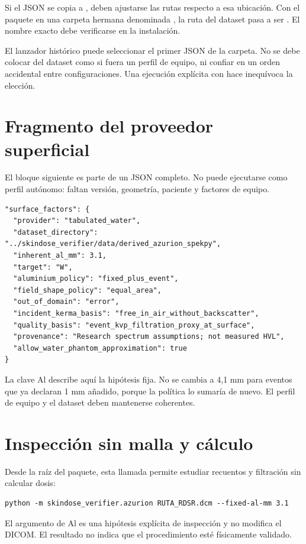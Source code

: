 Si el JSON se copia a , deben ajustarse las rutas respecto a esa ubicación. Con el paquete en una carpeta hermana denominada , la ruta del dataset pasa a ser . El nombre exacto debe verificarse en la instalación.

El lanzador histórico puede seleccionar el primer JSON de la carpeta. No se debe colocar  del dataset como si fuera un perfil de equipo, ni confiar en un orden accidental entre configuraciones. Una ejecución explícita con  hace inequívoca la elección.

\section{Fragmento del proveedor superficial}
El bloque siguiente es parte de un JSON completo. No puede ejecutarse como perfil autónomo: faltan versión, geometría, paciente y factores de equipo.
\begin{lstlisting}
"surface_factors": {
  "provider": "tabulated_water",
  "dataset_directory": "../skindose_verifier/data/derived_azurion_spekpy",
  "inherent_al_mm": 3.1,
  "target": "W",
  "aluminium_policy": "fixed_plus_event",
  "field_shape_policy": "equal_area",
  "out_of_domain": "error",
  "incident_kerma_basis": "free_in_air_without_backscatter",
  "quality_basis": "event_kvp_filtration_proxy_at_surface",
  "provenance": "Research spectrum assumptions; not measured HVL",
  "allow_water_phantom_approximation": true
}
\end{lstlisting}
La clave Al describe aquí la hipótesis fija. No se cambia a 4,1 mm para eventos que ya declaran 1 mm añadido, porque la política lo sumaría de nuevo. El perfil de equipo y el dataset deben mantenerse coherentes.

\section{Inspección sin malla y cálculo}
Desde la raíz del paquete, esta llamada permite estudiar recuentos y filtración sin calcular dosis:
\begin{lstlisting}
python -m skindose_verifier.azurion RUTA_RDSR.dcm --fixed-al-mm 3.1
\end{lstlisting}
El argumento de Al es una hipótesis explícita de inspección y no modifica el DICOM. El resultado no indica que el procedimiento esté físicamente validado.

